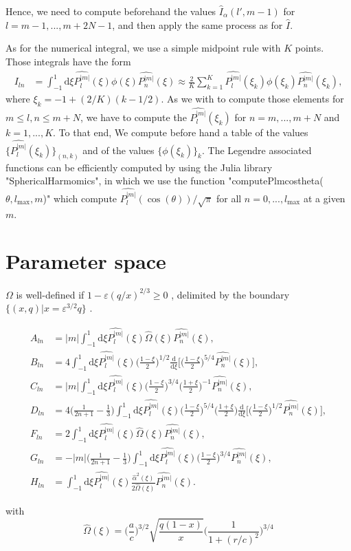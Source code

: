 \documentclass[11pt]{article}
\newcommand{\rd}{\mathrm{d}}
\newcommand{\Pnm}{P_n^{|m|}}
\newcommand{\Plm}{P_l^{|m|}}
\newcommand{\hPnm}{\widehat{\Pnm}}
\newcommand{\hPlm}{\widehat{\Plm}}
\newcommand{\hI}{\widehat{I}}
\newcommand{\hOmega}{\widehat{\Omega}}
\newcommand{\halpha}{\widehat{\alpha}}
\begin{document}
Hence, we need to compute beforehand the values $\hI_{\alpha}(l',m-1)$ for $l=m-1,...,m+2N-1$, and then apply the same process as for $\hI$. 

As for the numerical integral, we use a simple midpoint rule with $K$ points. Those integrals have the form
\begin{align*}
I_{ln} &= \int_{-1}^{1} \rd \xi \hPlm(\xi) \phi(\xi) \hPnm(\xi) \approx \frac{2}{K} \sum_{k=1}^{K} \hPlm(\xi_{k}) \phi(\xi_{k}) \hPnm(\xi_{k}),
\end{align*}
where $\xi_{k} = -1 + (2/K)(k-1/2)$. As we with to compute those elements for $m \leq l,n \leq m+N$, we have to compute the $\hPlm(\xi_{k})$ for $n=m,...,m+N$ and $k=1,...,K$. To that end, We compute before hand a table of the values $\{\hPlm(\xi_{k})\}_{(n,k)}$ and of the values $\{\phi(\xi_{k})\}_{k}$. The Legendre associated functions can be efficiently computed by using the Julia library "SphericalHarmomics", in which we use the function "computePlmcostheta($\theta,l_{\max},m$)" which compute $\hPlm(\cos(\theta))/\sqrt{\pi}$ for all $n=0,...,l_{\max}$ at a given $m$.

\section{Parameter space}

$\Omega$ is well-defined if $1- \varepsilon(q/x)^{2/3} \geq 0$ , delimited by the boundary
$\{(x,q)|x= \varepsilon^{3/2} q\}$ .

\begin{align*}
A_{ln} &= |m| \int_{-1}^{1} \rd \xi  \hPlm(\xi)\hOmega(\xi)\hPnm(\xi) , \\
B_{ln} &= 4 \int_{-1}^{1} \rd \xi  \hPlm(\xi) \bigg(\frac{1-\xi}{2}\bigg)^{1/2} \frac{\rd}{\rd \xi} \bigg[\bigg(\frac{1-\xi}{2}\bigg)^{5/4}\hPnm(\xi)\bigg], \\
C_{ln} &= |m| \int_{-1}^{1} \rd \xi \hPlm(\xi) \bigg(\frac{1-\xi}{2}\bigg)^{3/4}\bigg(\frac{1+\xi}{2}\bigg)^{-1}   \hPnm(\xi), \\
D_{ln} &= 4 \bigg(\frac{1}{2n+1}-\frac{1}{3} \bigg) \int_{-1}^{1} \rd \xi \hPlm(\xi)  \bigg(\frac{1-\xi}{2}\bigg)^{5/4} \bigg(\frac{1+\xi}{2}\bigg) 
\frac{\rd}{\rd \xi} \bigg[ \bigg(\frac{1-\xi}{2}\bigg)^{1/2}\hPnm(\xi) \bigg] ,\\
F_{ln} &=2 \int_{-1}^{1} \rd \xi  \hPlm(\xi)\hOmega(\xi)\hPnm(\xi) , \\
G_{ln} &= -|m| \bigg(\frac{1}{2n+1}-\frac{1}{3} \bigg)  \int_{-1}^{1} \rd \xi \hPlm(\xi)  \bigg(\frac{1-\xi}{2}\bigg)^{3/4} 
\hPnm(\xi)  ,\\
H_{ln} &=  \int_{-1}^{1} \rd \xi  \hPlm(\xi)\frac{\halpha^2(\xi)}{2\hOmega(\xi)}\hPnm(\xi) .
\end{align*}

with
$$
\hOmega(\xi) = \bigg(\frac{a}{c}\bigg)^{3/2}\sqrt{ \frac{q(1-x)}{x}}\bigg(\frac{1}{1+(r/c)^2}\bigg)^{3/4}
 $$
\end{document}
